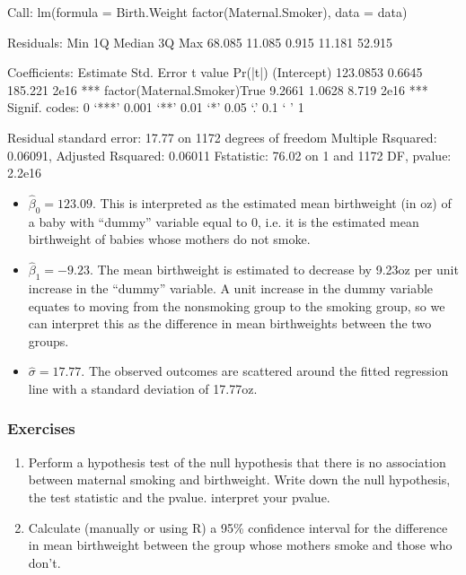 \documentclass[letterpaper,10pt,english]{jupyterBook}
\begin{document}
\begin{sphinxVerbatim}[commandchars=\\\{\}]
Call:
lm(formula = Birth.Weight \PYGZti{} factor(Maternal.Smoker), data = data)

Residuals:
    Min      1Q  Median      3Q     Max 
\PYGZhy{}68.085 \PYGZhy{}11.085   0.915  11.181  52.915 

Coefficients:
                            Estimate Std. Error t value Pr(\PYGZgt{}|t|)    
(Intercept)                 123.0853     0.6645 185.221   \PYGZlt{}2e\PYGZhy{}16 ***
factor(Maternal.Smoker)True  \PYGZhy{}9.2661     1.0628  \PYGZhy{}8.719   \PYGZlt{}2e\PYGZhy{}16 ***
\PYGZhy{}\PYGZhy{}\PYGZhy{}
Signif. codes:  0 ‘***’ 0.001 ‘**’ 0.01 ‘*’ 0.05 ‘.’ 0.1 ‘ ’ 1

Residual standard error: 17.77 on 1172 degrees of freedom
Multiple R\PYGZhy{}squared:  0.06091,	Adjusted R\PYGZhy{}squared:  0.06011 
F\PYGZhy{}statistic: 76.02 on 1 and 1172 DF,  p\PYGZhy{}value: \PYGZlt{} 2.2e\PYGZhy{}16
\end{sphinxVerbatim}
\begin{itemize}
\item {} 
\sphinxAtStartPar
\(\hat{\beta}_0 = 123.09\). This is interpreted as the estimated mean birthweight (in oz) of a baby with “dummy” variable equal to 0, i.e. it is the estimated mean birthweight of babies whose mothers do not smoke.

\item {} 
\sphinxAtStartPar
\(\hat{\beta}_1=-9.23\). The mean birthweight is estimated to decrease by 9.23oz per unit increase in the “dummy” variable. A unit increase in the dummy variable equates to moving from the non\sphinxhyphen{}smoking group to the smoking group, so we can interpret this as the difference in mean birthweights between the two groups.

\item {} 
\sphinxAtStartPar
\(\hat{\sigma}=17.77\). The observed outcomes are scattered around the fitted regression line with a standard deviation of 17.77oz.

\end{itemize}


\subsubsection{Exercises}
\label{\detokenize{12.h. Linear Regression I:exercises}}\begin{enumerate}
%
\item {} 
\sphinxAtStartPar
Perform a hypothesis test of the null hypothesis that there is no association between maternal smoking and birthweight. Write down the null hypothesis, the test statistic and the p\sphinxhyphen{}value. interpret your p\sphinxhyphen{}value.

\item {} 
\sphinxAtStartPar
Calculate (manually or using R) a 95\% confidence interval for the difference in mean birthweight between the group whose mothers smoke and those who don’t.

\end{enumerate}
\end{document}

